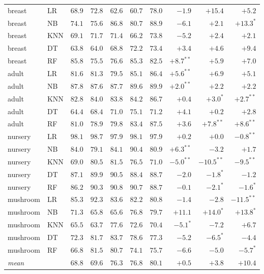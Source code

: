 \documentclass[sigconf,anonymous,review]{acmart}
\begin{document}
\begin{table}[t]
\begin{tabular}{llrrrrrrrr}
\addlinespace
breast     & LR   & $68.9$ & $72.8$ & $62.6$ & $60.7$ & $78.0$ & $-1.9$ & $+15.4$ & $+5.2$ \\
breast     & NB   & $74.1$ & $75.6$ & $86.8$ & $80.7$ & $88.9$ & $-6.1$ & $+2.1$ & $+13.3^{*}$ \\
breast     & KNN  & $69.1$ & $71.7$ & $71.4$ & $66.2$ & $73.8$ & $-5.2$ & $+2.4$ & $+2.1$ \\
breast     & DT   & $63.8$ & $64.0$ & $68.8$ & $72.2$ & $73.4$ & $+3.4$ & $+4.6$ & $+9.4$ \\
breast     & RF   & $85.8$ & $75.5$ & $76.6$ & $85.3$ & $82.5$ & $+8.7^{**}$ & $+5.9$ & $+7.0$ \\
\addlinespace
adult      & LR   & $81.6$ & $81.3$ & $79.5$ & $85.1$ & $86.4$ & $+5.6^{**}$ & $+6.9$ & $+5.1$ \\
adult      & NB   & $87.8$ & $87.6$ & $87.7$ & $89.6$ & $89.9$ & $+2.0^{**}$ & $+2.2$ & $+2.2$ \\
adult      & KNN  & $82.8$ & $84.0$ & $83.8$ & $84.2$ & $86.7$ & $+0.4$ & $+3.0^{*}$ & $+2.7^{**}$ \\
adult      & DT   & $64.4$ & $68.4$ & $71.0$ & $75.1$ & $71.2$ & $+4.1$ & $+0.2$ & $+2.8$ \\
adult      & RF   & $81.0$ & $78.9$ & $79.8$ & $83.4$ & $87.5$ & $+3.6$ & $+7.8^{**}$ & $+8.6^{**}$ \\
\addlinespace
nursery    & LR   & $98.1$ & $98.7$ & $97.9$ & $98.1$ & $97.9$ & $+0.2$ & $+0.0$ & $-0.8^{**}$ \\
nursery    & NB   & $84.0$ & $79.1$ & $84.1$ & $90.4$ & $80.9$ & $+6.3^{**}$ & $-3.2$ & $+1.7$ \\
nursery    & KNN  & $69.0$ & $80.5$ & $81.5$ & $76.5$ & $71.0$ & $-5.0^{**}$ & $-10.5^{**}$ & $-9.5^{**}$ \\
nursery    & DT   & $87.1$ & $89.9$ & $90.5$ & $88.4$ & $88.7$ & $-2.0$ & $-1.8^{*}$ & $-1.2$ \\
nursery    & RF   & $86.2$ & $90.3$ & $90.8$ & $90.7$ & $88.7$ & $-0.1$ & $-2.1^{*}$ & $-1.6^{*}$ \\
\addlinespace
mushroom   & LR   & $85.3$ & $92.3$ & $83.6$ & $82.2$ & $80.8$ & $-1.4$ & $-2.8$ & $-11.5^{**}$ \\
mushroom   & NB   & $71.3$ & $65.8$ & $65.6$ & $76.8$ & $79.7$ & $+11.1$ & $+14.0^{*}$ & $+13.8^{*}$ \\
mushroom   & KNN  & $65.5$ & $63.7$ & $77.6$ & $72.6$ & $70.4$ & $-5.1^{*}$ & $-7.2$ & $+6.7$ \\
mushroom   & DT   & $72.3$ & $81.7$ & $83.7$ & $78.6$ & $77.3$ & $-5.2$ & $-6.5^{*}$ & $-4.4$ \\
mushroom   & RF   & $66.8$ & $81.5$ & $80.7$ & $74.1$ & $75.7$ & $-6.6$ & $-5.0$ & $-5.7^{*}$ \\
\midrule
\multicolumn{2}{l}{\emph{mean}} & $68.8$ & $69.6$ & $76.3$ & $76.8$ & $80.1$ & $+0.5$ & $+3.8$ & $+10.4$ \\
\bottomrule
\end{tabular}
\end{table}
\end{document}
